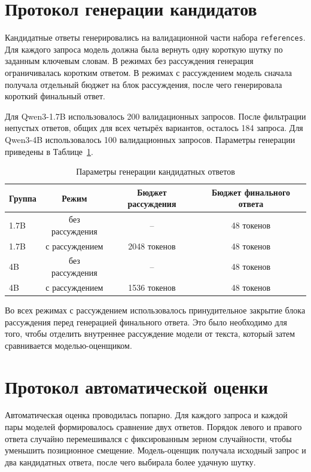 \section{Протокол генерации кандидатов}

Кандидатные ответы генерировались на валидационной части набора \texttt{references}. Для каждого запроса модель должна была вернуть одну короткую шутку по заданным ключевым словам. В режимах без рассуждения генерация ограничивалась коротким ответом. В режимах с рассуждением модель сначала получала отдельный бюджет на блок рассуждения, после чего генерировала короткий финальный ответ.

Для Qwen3-1.7B использовалось 200 валидационных запросов. После фильтрации непустых ответов, общих для всех четырёх вариантов, осталось 184 запроса. Для Qwen3-4B использовалось 100 валидационных запросов. Параметры генерации приведены в Таблице~\ref{tab:generation-protocol}.

\begin{table}[h]
    \centering
    \caption{Параметры генерации кандидатных ответов}
    \label{tab:generation-protocol}
    \begin{tabular}{lccc}
        \hline
        Группа & Режим           & Бюджет рассуждения & Бюджет финального ответа \\
        \hline
        1.7B   & без рассуждения & --                 & 48 токенов               \\
        1.7B   & с рассуждением  & 2048 токенов       & 48 токенов               \\
        4B     & без рассуждения & --                 & 48 токенов               \\
        4B     & с рассуждением  & 1536 токенов       & 48 токенов               \\
        \hline
    \end{tabular}
\end{table}

Во всех режимах с рассуждением использовалось принудительное закрытие блока рассуждения перед генерацией финального ответа. Это было необходимо для того, чтобы отделить внутреннее рассуждение модели от текста, который затем сравнивается моделью-оценщиком.

\section{Протокол автоматической оценки}

Автоматическая оценка проводилась попарно. Для каждого запроса и каждой пары моделей формировалось сравнение двух ответов. Порядок левого и правого ответа случайно перемешивался с фиксированным зерном случайности, чтобы уменьшить позиционное смещение. Модель-оценщик получала исходный запрос и два кандидатных ответа, после чего выбирала более удачную шутку.

